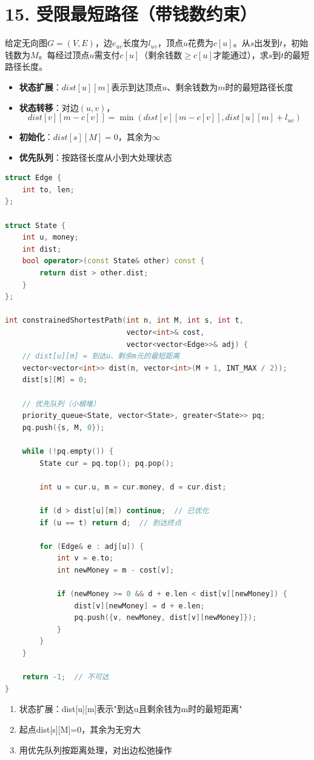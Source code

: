 \section*{15. 受限最短路径（带钱数约束）}

给定无向图$G=(V,E)$，边$e_{uv}$长度为$l_{uv}$，顶点$u$花费为$c[u]$。从$s$出发到$t$，初始钱数为$M$。每经过顶点$u$需支付$c[u]$（剩余钱数$\ge c[u]$才能通过），求$s$到$t$的最短路径长度。



\begin{itemize}
    \item \textbf{状态扩展}：$dist[u][m]$表示到达顶点$u$、剩余钱数为$m$时的最短路径长度
    \item \textbf{状态转移}：对边$(u,v)$，$$dist[v][m-c[v]] = \min(dist[v][m-c[v]], dist[u][m] + l_{uv})$$
    \item \textbf{初始化}：$dist[s][M] = 0$，其余为$\infty$
    \item \textbf{优先队列}：按路径长度从小到大处理状态
\end{itemize}
\begin{lstlisting}[language=C++, style=cppstyle]
struct Edge {
    int to, len;
};

struct State {
    int u, money;
    int dist;
    bool operator>(const State& other) const {
        return dist > other.dist;
    }
};

int constrainedShortestPath(int n, int M, int s, int t,
                            vector<int>& cost,
                            vector<vector<Edge>>& adj) {
    // dist[u][m] = 到达u、剩余m元的最短距离
    vector<vector<int>> dist(n, vector<int>(M + 1, INT_MAX / 2));
    dist[s][M] = 0;

    // 优先队列（小根堆）
    priority_queue<State, vector<State>, greater<State>> pq;
    pq.push({s, M, 0});

    while (!pq.empty()) {
        State cur = pq.top(); pq.pop();

        int u = cur.u, m = cur.money, d = cur.dist;

        if (d > dist[u][m]) continue;  // 已优化
        if (u == t) return d;  // 到达终点

        for (Edge& e : adj[u]) {
            int v = e.to;
            int newMoney = m - cost[v];

            if (newMoney >= 0 && d + e.len < dist[v][newMoney]) {
                dist[v][newMoney] = d + e.len;
                pq.push({v, newMoney, dist[v][newMoney]});
            }
        }
    }

    return -1;  // 不可达
}
\end{lstlisting}


\begin{enumerate}
    \item 状态扩展：dist[u][m]表示"到达u且剩余钱为m时的最短距离"
    \item 起点dist[s][M]=0，其余为无穷大
    \item 用优先队列按距离处理，对出边松弛操作
\end{enumerate}

